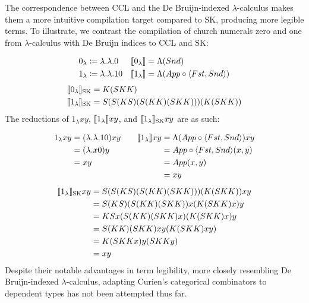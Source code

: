 \documentclass{lmcs}
\newcommand{\ccl}{\(\text{CCL}\)} %
\newcommand{\sk}{\(\text{SK}\)}
\newcommand{\ske}{\text{SK}}
\newcommand{\la}{\langle}
\newcommand{\ra}{\rangle}
\begin{document}
The correspondence between \ccl{} and the De Bruijn-indexed \(\lambda\)-calculus makes them a more intuitive compilation target compared to \sk{}, producing more legible terms. To illustrate, we contrast the compilation of church numerals zero and one from \(\lambda\)-calculus with De Bruijn indices to \ccl{} and \sk{}:

\begin{align*}
  0_{\lambda} &\coloneq \lambda . \lambda . 0 & \compile{0_{\lambda}} &= \Lambda(Snd) \\
  1_{\lambda} &\coloneq \lambda . \lambda . 1 0 & \compile{1_{\lambda}} &= \Lambda(App \circ \la Fst, Snd \ra)
\end{align*}
\begin{align*}
  \compile[\ske]{0_{\lambda}} &= K (S K K)\\
  \compile[\ske]{1_{\lambda}} &= S (S (K S) (S (K K) (S K K))) (K (S K K))
\end{align*}
The reductions of \(1_{\lambda} x y\), \(\compile{1_{\lambda}} x y\), and \(\compile[\ske]{1_{\lambda}} x y\) are as such:

\begin{equation*}
  \begin{aligned}[t]
    1_{\lambda} x y &= (\lambda . \lambda . 1 0) x y\\
    &= (\lambda . x 0) y\\
    &= x y
  \end{aligned}
  \qquad
  \begin{aligned}[t]
    \compile{1_{\lambda}} x y &= \Lambda(App \circ \la Fst, Snd \ra) x y\\
    &= App \circ \la Fst, Snd \ra (x, y)\\
    &= App (x, y)\\
    &= x y
  \end{aligned}
\end{equation*}
\begin{equation*}
  \begin{aligned}[t]
    \compile[\ske]{1_{\lambda}} x y &= S (S (K S) (S (K K) (S K K))) (K (S K K)) x y\\
                               &= S (K S) (S (K K) (S K K)) x (K (S K K) x) y\\
                               &= K S x (S (K K) (S K K) x) (K (S K K) x) y\\
                               &= S (K K) (S K K) x y (K (S K K) x y)\\
                               &= K (S K K x) y (S K K y)\\
                               &= x y
  \end{aligned}
\end{equation*}
Despite their notable advantages in term legibility, more closely resembling De Bruijn-indexed \(\lambda\)-calculus, adapting Curien's categorical combinators to dependent types has not been attempted thus far.
\end{document}
